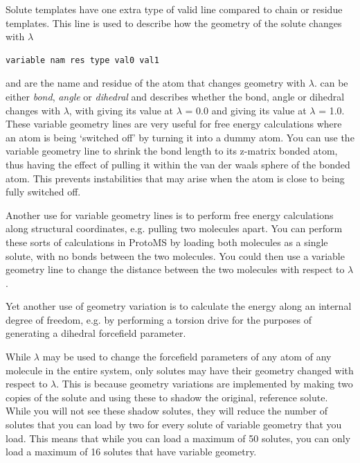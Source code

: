 \documentclass[letterpaper,10pt,english]{sphinxmanual}
\begin{document}
Solute templates have one extra type of valid line compared to chain or residue templates. This line is used to describe how the geometry of the solute changes with \(\lambda\)

\begin{Verbatim}[frame=single,commandchars=\\\{\}]
variable nam res type val0 val1
\end{Verbatim}

 and  are the name and residue of the atom that changes geometry with \(\lambda\).  can be either \emph{bond}, \emph{angle} or \emph{dihedral} and describes whether the bond, angle or dihedral changes with \(\lambda\), with  giving its value at \(\lambda\) = 0.0 and  giving its value at \(\lambda\) = 1.0. These variable geometry lines are very useful for free energy calculations where an atom is being ‘switched off’ by turning it into a dummy atom. You can use the variable geometry line to shrink the bond length to its z-matrix bonded atom, thus having the effect of pulling it within the van der waals sphere of the bonded atom. This prevents instabilities that may arise when the atom is close to being fully switched off.

Another use for variable geometry lines is to perform free energy calculations along structural coordinates, e.g. pulling two molecules apart. You can perform these sorts of calculations in ProtoMS by loading both molecules as a single solute, with no bonds between the two molecules. You could then use a variable geometry line to change the distance between the two molecules with respect to \(\lambda\).

Yet another use of geometry variation is to calculate the energy along an internal degree of freedom, e.g. by performing a torsion drive for the purposes of generating a dihedral forcefield parameter.

While \(\lambda\) may be used to change the forcefield parameters of any atom of any molecule in the entire system, only solutes may have their geometry changed with respect to \(\lambda\). This is because geometry variations are implemented by making two copies of the solute and using these to shadow the original, reference solute. While you will not see these shadow solutes, they will reduce the number of solutes that you can load by two for every solute of variable geometry that you load. This means that while you can load a maximum of 50 solutes, you can only load a maximum of 16 solutes that have variable geometry.
\end{document}
